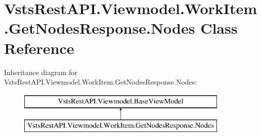 \hypertarget{class_vsts_rest_a_p_i_1_1_viewmodel_1_1_work_item_1_1_get_nodes_response_1_1_nodes}{}\section{Vsts\+Rest\+A\+P\+I.\+Viewmodel.\+Work\+Item.\+Get\+Nodes\+Response.\+Nodes Class Reference}
\label{class_vsts_rest_a_p_i_1_1_viewmodel_1_1_work_item_1_1_get_nodes_response_1_1_nodes}
Inheritance diagram for Vsts\+Rest\+A\+P\+I.\+Viewmodel.\+Work\+Item.\+Get\+Nodes\+Response.\+Nodes\+:\begin{figure}[H]
\begin{center}
\leavevmode
\includegraphics[height=2.000000cm]{class_vsts_rest_a_p_i_1_1_viewmodel_1_1_work_item_1_1_get_nodes_response_1_1_nodes}
\end{center}
\end{figure}
